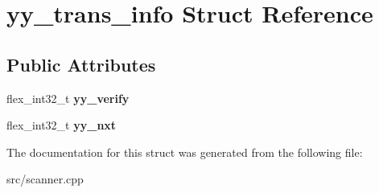 \hypertarget{structyy__trans__info}{}\section{yy\+\_\+trans\+\_\+info Struct Reference}
\label{structyy__trans__info}
\subsection*{Public Attributes}
\begin{DoxyCompactItemize}
\item 
\hypertarget{structyy__trans__info_a5c9f61e770deef50bd4e697310342fe9}{}flex\+\_\+int32\+\_\+t {\bfseries yy\+\_\+verify}\label{structyy__trans__info_a5c9f61e770deef50bd4e697310342fe9}

\item 
\hypertarget{structyy__trans__info_ae0715250c2bef261e596e77e0030f13e}{}flex\+\_\+int32\+\_\+t {\bfseries yy\+\_\+nxt}\label{structyy__trans__info_ae0715250c2bef261e596e77e0030f13e}

\end{DoxyCompactItemize}


The documentation for this struct was generated from the following file\+:\begin{DoxyCompactItemize}
\item 
src/scanner.\+cpp\end{DoxyCompactItemize}
